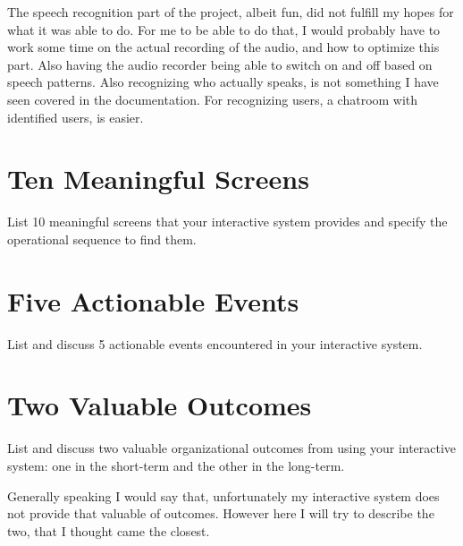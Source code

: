 \documentclass[11pt,fleqn]{book} %
\begin{document}
The speech recognition part of the project, albeit fun, did not fulfill my hopes for what it was able to do. For me to be able to do that, I would probably have to work some time on the actual recording of the audio, and how to optimize this part. Also having the audio recorder being able to switch on and off based on speech patterns.
Also recognizing who actually speaks, is not something I have seen covered in the documentation.
For recognizing users, a chatroom with identified users, is easier.


\chapter{Ten Meaningful Screens}
List 10 meaningful screens that your interactive system provides and specify the operational sequence to find them.


\chapter{Five Actionable Events}
List and discuss 5 actionable events encountered in your interactive system.


\chapter{Two Valuable Outcomes}
List and discuss two valuable organizational outcomes from using your interactive system: one in the short-term and the other in the long-term. 

Generally speaking I would say that, unfortunately my interactive system does not provide that valuable of outcomes.
However here I will try to describe the two, that I thought came the closest.
\end{document}
